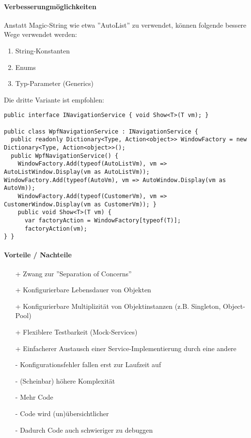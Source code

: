 \paragraph{Verbesserungmöglichkeiten}
Anstatt Magic-String wie etwa ''AutoList'' zu verwendet, können folgende bessere Wege verwendet werden:
\begin{enumerate}
    \item String-Konstanten 
    \item Enums
    \item Typ-Parameter (Generics)
\end{enumerate}
Die dritte Variante ist empfohlen:

\begin{lstlisting}
public interface INavigationService { void Show<T>(T vm); }

public class WpfNavigationService : INavigationService { 
  public readonly Dictionary<Type, Action<object>> WindowFactory = new Dictionary<Type, Action<object>>();
  public WpfNavigationService() { 
    WindowFactory.Add(typeof(AutoListVm), vm => AutoListWindow.Display(vm as AutoListVm)); WindowFactory.Add(typeof(AutoVm), vm => AutoWindow.Display(vm as AutoVm)); 
    WindowFactory.Add(typeof(CustomerVm), vm => CustomerWindow.Display(vm as CustomerVm)); } 
    public void Show<T>(T vm) {
      var factoryAction = WindowFactory[typeof(T)];
      factoryAction(vm);
} } 
\end{lstlisting}


\paragraph{Vorteile / Nachteile}
\begin{itemize}
    \item[+]  Zwang zur ''Separation of Concerns'' 
    \item[+] Konfigurierbare Lebensdauer von Objekten 
    \item[+] Konfigurierbare Multiplizität von Objektinstanzen (z.B. Singleton, Object-Pool) 
    \item[+] Flexiblere Testbarkeit (Mock-Services) 
    \item[+] Einfacherer Austausch einer Service-Implementierung durch eine andere 
    \item[-] Konfigurationsfehler fallen erst zur Laufzeit auf 
    \item[-] (Scheinbar) höhere Komplexität 
    \item[-] Mehr Code 
    \item[-] Code wird (un)übersichtlicher
    \item[-] Dadurch Code auch schwieriger zu debuggen
\end{itemize}


